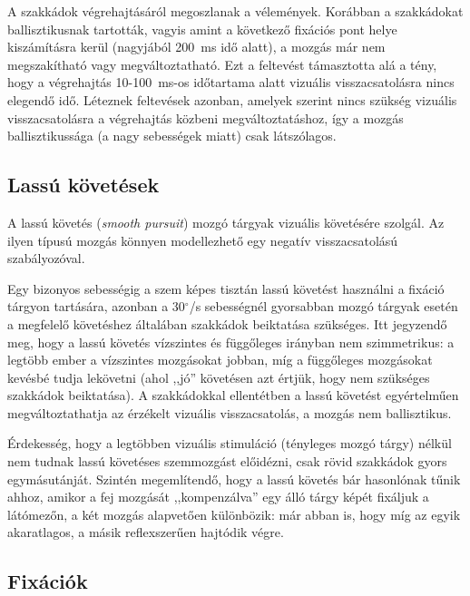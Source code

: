 A szakkádok végrehajtásáról megoszlanak a vélemények. Korábban a szakkádokat ballisztikusnak tartották, vagyis amint a következő fixációs pont helye kiszámításra kerül (nagyjából 200~ms idő alatt), a mozgás már nem megszakítható vagy megváltoztatható. \cite{carpenter_book} Ezt a feltevést támasztotta alá a tény, hogy a végrehajtás 10-100~ms-os időtartama alatt vizuális visszacsatolásra nincs elegendő idő. Léteznek feltevések azonban, amelyek szerint nincs szükség vizuális visszacsatolásra a végrehajtás közbeni megváltoztatáshoz, így a mozgás ballisztikussága (a nagy sebességek miatt) csak látszólagos. \cite{zee}

\subsection{Lassú követések}\label{sect:lassukovetes}

A lassú követés (\emph{smooth pursuit}) mozgó tárgyak vizuális követésére szolgál. Az ilyen típusú mozgás könnyen modellezhető egy negatív visszacsatolású szabályozóval. \cite{carpenter_book}

Egy bizonyos sebességig a szem képes tisztán lassú követést használni a fixáció tárgyon tartására, azonban a 30$^{\circ}$/s sebességnél gyorsabban mozgó tárgyak esetén a megfelelő követéshez általában szakkádok beiktatása szükséges. Itt jegyzendő meg, hogy a lassú követés vízszintes és függőleges irányban nem szimmetrikus: a legtöbb ember a vízszintes mozgásokat jobban, míg a függőleges mozgásokat kevésbé tudja lekövetni (ahol ,,jó'' követésen azt értjük, hogy nem szükséges szakkádok beiktatása). A szakkádokkal ellentétben a lassú követést egyértelműen megváltoztathatja az érzékelt vizuális visszacsatolás, a mozgás nem ballisztikus.

Érdekesség, hogy a legtöbben vizuális stimuláció (tényleges mozgó tárgy) nélkül nem tudnak lassú követéses szemmozgást előidézni, csak rövid szakkádok gyors egymásutánját. Szintén megemlítendő, hogy a lassú követés bár hasonlónak tűnik ahhoz, amikor a fej mozgását ,,kompenzálva'' egy álló tárgy képét fixáljuk a látómezőn, a két mozgás alapvetően különbözik: már abban is, hogy míg az egyik akaratlagos, a másik reflexszerűen hajtódik végre.

\subsection{Fixációk}\label{sect:fixaciok}

